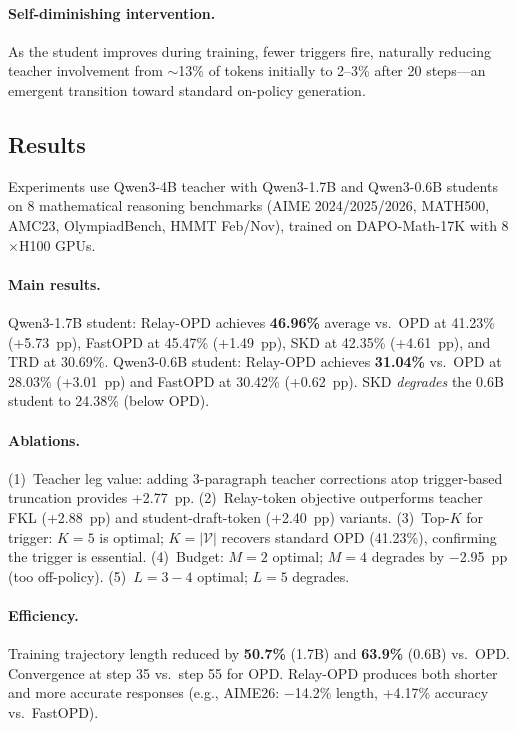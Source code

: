 \documentclass[11pt,a4paper]{article}
\begin{document}
\paragraph{Self-diminishing intervention.}
As the student improves during training, fewer triggers fire, naturally reducing teacher involvement from $\sim$13\% of tokens initially to 2--3\% after 20 steps---an emergent transition toward standard on-policy generation.

\subsection{Results}

Experiments use Qwen3-4B teacher with Qwen3-1.7B and Qwen3-0.6B students on 8 mathematical reasoning benchmarks (AIME 2024/2025/2026, MATH500, AMC23, OlympiadBench, HMMT Feb/Nov), trained on DAPO-Math-17K with 8$\times$H100 GPUs.

\paragraph{Main results.}
Qwen3-1.7B student: Relay-OPD achieves \textbf{46.96\%} average vs.\ OPD at 41.23\% (+5.73~pp), FastOPD at 45.47\% (+1.49~pp), SKD at 42.35\% (+4.61~pp), and TRD at 30.69\%. Qwen3-0.6B student: Relay-OPD achieves \textbf{31.04\%} vs.\ OPD at 28.03\% (+3.01~pp) and FastOPD at 30.42\% (+0.62~pp). SKD \emph{degrades} the 0.6B student to 24.38\% (below OPD).

\paragraph{Ablations.}
(1)~Teacher leg value: adding 3-paragraph teacher corrections atop trigger-based truncation provides +2.77~pp. (2)~Relay-token objective outperforms teacher FKL (+2.88~pp) and student-draft-token (+2.40~pp) variants. (3)~Top-$K$ for trigger: $K=5$ is optimal; $K=|\mathcal{V}|$ recovers standard OPD (41.23\%), confirming the trigger is essential. (4)~Budget: $M=2$ optimal; $M=4$ degrades by $-$2.95~pp (too off-policy). (5)~$L=3{-}4$ optimal; $L=5$ degrades.

\paragraph{Efficiency.}
Training trajectory length reduced by \textbf{50.7\%} (1.7B) and \textbf{63.9\%} (0.6B) vs.\ OPD. Convergence at step 35 vs.\ step 55 for OPD. Relay-OPD produces both shorter and more accurate responses (e.g., AIME26: $-$14.2\% length, +4.17\% accuracy vs.\ FastOPD).
\end{document}
